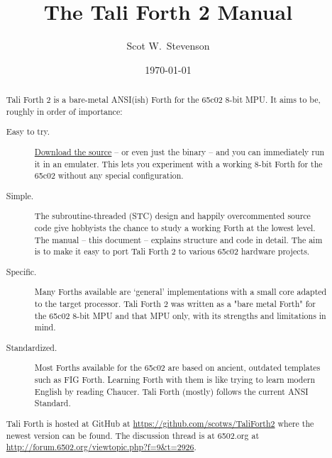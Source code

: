 \documentclass[a4paper,notitlepage]{report}
\title{The Tali Forth 2 Manual}
\author{Scot W.~Stevenson}
\date{\today}
\begin{document}
\maketitle

\begin{abstract}
        Tali Forth 2 is a bare-metal ANSI(ish) Forth for the 65c02 8-bit MPU. 
        It aims to be, roughly in order of importance: 

        \begin{description}

        \item [Easy to try.]
                \href{https://github.com/scotws/TaliForth2}{Download the source}
                -- or even just the binary -- and you can immediately
                run it in an emulater. This lets you experiment with a
                working 8-bit Forth for the 65c02 without any special
                configuration.

        \item [Simple.] The subroutine-threaded (STC) design and happily
                overcommented source code give hobbyists the chance to study a
                working Forth at the lowest level. The manual -- this
                document -- explains structure and code in detail. The aim
                is to make it easy to port Tali Forth 2
                to various 65c02 hardware projects.

        \item [Specific.] Many Forths available are `general' implementations with
                a small core adapted to the target processor. Tali Forth 2 was
                written as a "bare metal Forth" for the 65c02 8-bit MPU
                and that MPU only, with its strengths and limitations in
                mind.

        \item [Standardized.] Most Forths available for the 65c02 are based on ancient,
                outdated templates such as FIG Forth. Learning Forth with them is like
                trying to learn modern English by reading Chaucer. Tali
                Forth (mostly) follows the current ANSI Standard.
\end{description}

        Tali Forth is hosted at GitHub at
        \href{https://github.com/scotws/TaliForth2}{https://github.com/scotws/TaliForth2}
        where the newest version can be found. The discussion thread is at
        6502.org at
        \href{http://forum.6502.org/viewtopic.php?f=9\&t=2926}{http://forum.6502.org/viewtopic.php?f=9\&t=2926}.
        
\end{abstract}
\end{document}
